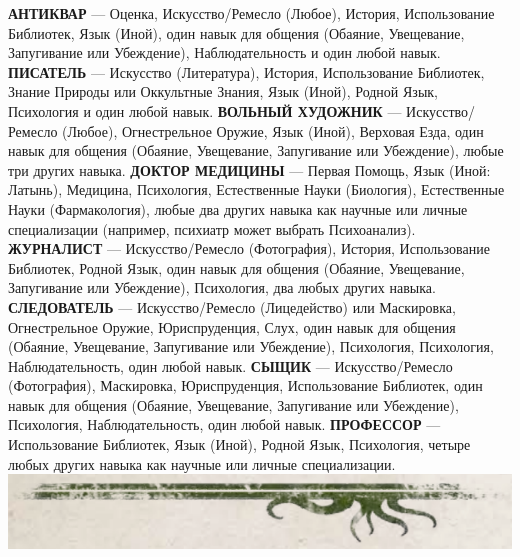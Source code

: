 \documentclass[letterpaper,twocolumn,openany, twoside, 11pt, usenames]{cocbook}
\begin{document}
\begin{cocpaperbox}{}{}
  \textbf{АНТИКВАР} --- Оценка, Искусство/Ремесло (Любое), История, Использование Библиотек, Язык (Иной), один навык для общения (Обаяние, Увещевание, Запугивание или Убеждение), Наблюдательность и один любой навык.
  \bigbreak
  \textbf{ПИСАТЕЛЬ} --- Искусство (Литература), История, Использование Библиотек, Знание Природы или Оккультные Знания, Язык (Иной), Родной Язык, Психология и один любой навык.
  \bigbreak
  \textbf{ВОЛЬНЫЙ ХУДОЖНИК} --- Искусство/Ремесло (Любое), Огнестрельное Оружие,  Язык (Иной), Верховая Езда, один навык для общения (Обаяние, Увещевание, Запугивание или Убеждение), любые три других навыка.
  \bigbreak
  \textbf{ДОКТОР МЕДИЦИНЫ} --- Первая Помощь, Язык (Иной: Латынь), Медицина, Психология, Естественные Науки (Биология), Естественные Науки (Фармакология), любые два других навыка как научные или личные специализации (например, психиатр может выбрать Психоанализ).
  \bigbreak
  \textbf{ЖУРНАЛИСТ} --- Искусство/Ремесло (Фотография), История, Использование Библиотек, Родной Язык, один навык для общения (Обаяние, Увещевание, Запугивание или Убеждение), Психология, два любых других навыка.
  \bigbreak
  \textbf{СЛЕДОВАТЕЛЬ} --- Искусство/Ремесло (Лицедейство) или Маскировка, Огнестрельное Оружие, Юриспруденция, Слух, один навык для общения (Обаяние, Увещевание, Запугивание или Убеждение), Психология, Психология, Наблюдательность, один любой навык.
  \bigbreak
  \textbf{СЫЩИК} --- Искусство/Ремесло (Фотография), Маскировка, Юриспруденция, Использование Библиотек, один навык для общения (Обаяние, Увещевание, Запугивание или Убеждение), Психология, Наблюдательность, один любой навык.
  \bigbreak
  \textbf{ПРОФЕССОР} --- Использование Библиотек, Язык (Иной), Родной Язык, Психология, четыре любых других навыка как научные или личные специализации.
  \includegraphics[width=\linewidth]{img/bottom.png}
\end{cocpaperbox}
\end{document}
